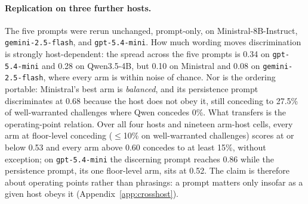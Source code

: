 \paragraph{Replication on three further hosts.} The five prompts were rerun unchanged,
prompt-only, on Ministral-8B-Instruct, \texttt{gemini-2.5-flash}, and \texttt{gpt-5.4-mini}.
How much wording moves discrimination is strongly host-dependent: the spread across the five
prompts is 0.34 on \texttt{gpt-5.4-mini} and 0.28 on Qwen3.5-4B, but 0.10 on Ministral and
0.08 on \texttt{gemini-2.5-flash}, where every arm is within noise of chance. Nor is the
ordering portable: Ministral's best arm is \emph{balanced}, and its persistence prompt
discriminates at 0.68 because the host does not obey it, still conceding to 27.5\% of
well-warranted challenges where Qwen concedes 0\%. What transfers is the operating-point
relation. Over all four hosts and nineteen arm-host cells, every arm at floor-level conceding
(\(\le\)10\% on well-warranted challenges) scores at or below 0.53 and every arm above 0.60
concedes to at least 15\%, without exception; on \texttt{gpt-5.4-mini} the discerning prompt
reaches 0.86 while the persistence prompt, its one floor-level arm, sits at 0.52. The claim is
therefore about operating points rather than phrasings: a prompt matters only insofar as a
given host obeys it (Appendix~\ref{app:crosshost}).


